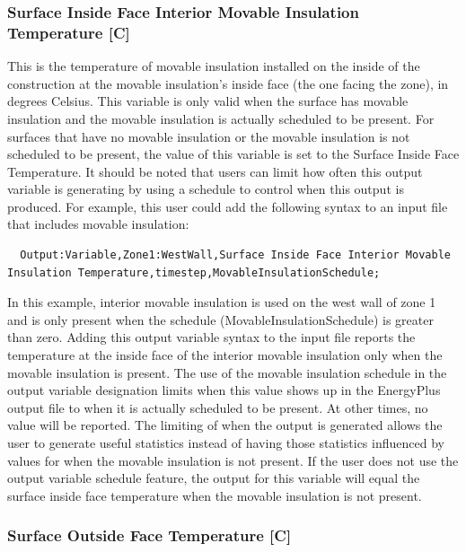 \subsubsection{Surface Inside Face Interior Movable Insulation Temperature {[}C{]}}\label{surface-inside-face-interior-movable-insulation-temperature-c}

This is the temperature of movable insulation installed on the inside of the construction at the movable insulation's inside face (the one facing the zone), in degrees Celsius. This variable is only valid when the surface has movable insulation and the movable insulation is actually scheduled to be present.  For surfaces that have no movable insulation or the movable insulation is not scheduled to be present, the value of this variable is set to the Surface Inside Face Temperature.  It should be noted that users can limit how often this output variable is generating by using a schedule to control when this output is produced.  For example, this user could add the following syntax to an input file that includes movable insulation:

\begin{lstlisting}
  Output:Variable,Zone1:WestWall,Surface Inside Face Interior Movable Insulation Temperature,timestep,MovableInsulationSchedule;
\end{lstlisting}

In this example, interior movable insulation is used on the west wall of zone 1 and is only present when the schedule (MovableInsulationSchedule) is greater than zero.  Adding this output variable syntax to the input file reports the temperature at the inside face of the interior movable insulation only when the movable insulation is present.  The use of the movable insulation schedule in the output variable designation limits when this value shows up in the EnergyPlus output file to when it is actually scheduled to be present.  At other times, no value will be reported.  The limiting of when the output is generated allows the user to generate useful statistics instead of having those statistics influenced by values for when the movable insulation is not present.  If the user does not use the output variable schedule feature, the output for this variable will equal the surface inside face temperature when the movable insulation is not present.

\subsubsection{Surface Outside Face Temperature {[}C{]}}\label{surface-outside-face-temperature-c}

